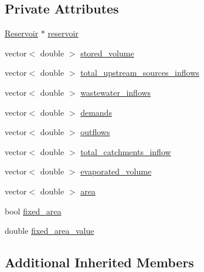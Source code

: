 \subsection*{Private Attributes}
\begin{DoxyCompactItemize}
\item 
\mbox{\hyperlink{classReservoir}{Reservoir}} $\ast$ \mbox{\hyperlink{classReservoirDataCollector_a188c8509a43e7f28362407f7508fde27_a188c8509a43e7f28362407f7508fde27}{reservoir}}
\item 
vector$<$ double $>$ \mbox{\hyperlink{classReservoirDataCollector_a6bf4ac702379a120800291cb72c040c5_a6bf4ac702379a120800291cb72c040c5}{stored\+\_\+volume}}
\item 
vector$<$ double $>$ \mbox{\hyperlink{classReservoirDataCollector_aa0d360efd8e64299b4effe3aab2ab8cc_aa0d360efd8e64299b4effe3aab2ab8cc}{total\+\_\+upstream\+\_\+sources\+\_\+inflows}}
\item 
vector$<$ double $>$ \mbox{\hyperlink{classReservoirDataCollector_ad923772e45d3ac1151d6cf444fc4bf60_ad923772e45d3ac1151d6cf444fc4bf60}{wastewater\+\_\+inflows}}
\item 
vector$<$ double $>$ \mbox{\hyperlink{classReservoirDataCollector_a2d603aa989995e0a2c6231dac81039c5_a2d603aa989995e0a2c6231dac81039c5}{demands}}
\item 
vector$<$ double $>$ \mbox{\hyperlink{classReservoirDataCollector_ae7599c36bb35ceec8906c1d9e48dc05c_ae7599c36bb35ceec8906c1d9e48dc05c}{outflows}}
\item 
vector$<$ double $>$ \mbox{\hyperlink{classReservoirDataCollector_a612fd61c495e4962660b96d1299ef775_a612fd61c495e4962660b96d1299ef775}{total\+\_\+catchments\+\_\+inflow}}
\item 
vector$<$ double $>$ \mbox{\hyperlink{classReservoirDataCollector_a7dd3a3878cec28c4b3f00b22d9aabacc_a7dd3a3878cec28c4b3f00b22d9aabacc}{evaporated\+\_\+volume}}
\item 
vector$<$ double $>$ \mbox{\hyperlink{classReservoirDataCollector_a45ffc0c08506a47f127fa1e8453baa25_a45ffc0c08506a47f127fa1e8453baa25}{area}}
\item 
bool \mbox{\hyperlink{classReservoirDataCollector_a7a2e049d0cbccf72a2150976ff4cf30b_a7a2e049d0cbccf72a2150976ff4cf30b}{fixed\+\_\+area}}
\item 
double \mbox{\hyperlink{classReservoirDataCollector_a0c65783631bb0254022e6bcf912600e2_a0c65783631bb0254022e6bcf912600e2}{fixed\+\_\+area\+\_\+value}}
\end{DoxyCompactItemize}
\subsection*{Additional Inherited Members}


